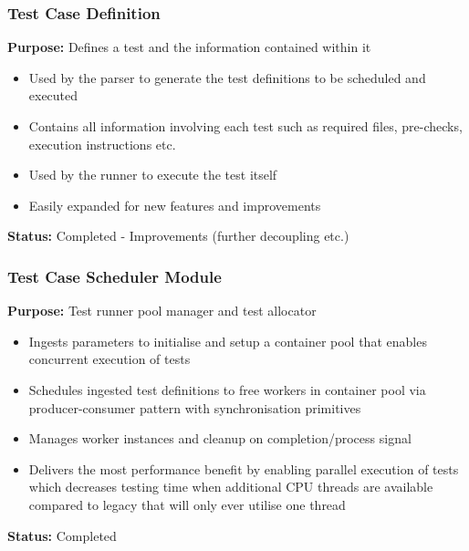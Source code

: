 \documentclass[xcolor, handout]{beamer}
\begin{document}
\begin{frame}
	\frametitle{Test Case Definition}
	\textbf{Purpose:} Defines a test and the information contained within it\\
	\begin{itemize}
		\item Used by the parser to generate the test definitions to be scheduled and executed
			\pause
		\item Contains all information involving each test such as required files, pre-checks, execution instructions etc.
			\pause
		\item Used by the runner to execute the test itself
			\pause
		\item Easily expanded for new features and improvements
			\pause
	\end{itemize}
	\textbf{Status:} Completed - Improvements (further decoupling etc.)
\end{frame}

\begin{frame}
	\frametitle{Test Case Scheduler Module}
	\textbf{Purpose:} Test runner pool manager and test allocator\\
	\begin{itemize}
		\item Ingests parameters to initialise and setup a container pool that enables concurrent execution of tests
			\pause
		\item Schedules ingested test definitions to free workers in container pool via producer-consumer pattern with synchronisation primitives
			\pause
		\item Manages worker instances and cleanup on completion/process signal
			\pause
		\item Delivers the most performance benefit by enabling parallel execution of tests which decreases testing time when additional CPU threads are available compared to legacy that will only ever utilise one thread
			\pause
	\end{itemize}
	\textbf{Status:} Completed
\end{frame}
\end{document}
